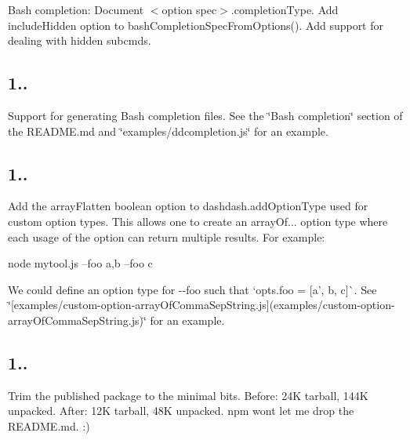 \begin{DoxyItemize}
\item Bash completion\+: Document {\ttfamily $<$option spec$>$.completion\+Type}. Add {\ttfamily include\+Hidden} option to {\ttfamily bash\+Completion\+Spec\+From\+Options()}. Add support for dealing with hidden subcmds.
\end{DoxyItemize}

\subsection*{1..}


\begin{DoxyItemize}
\item Support for generating Bash completion files. See the \char`\"{}\+Bash completion\char`\"{} section of the R\+E\+A\+D\+M\+E.\+md and \char`\"{}examples/ddcompletion.\+js\char`\"{} for an example.
\end{DoxyItemize}

\subsection*{1..}


\begin{DoxyItemize}
\item Add the {\ttfamily array\+Flatten} boolean option to {\ttfamily dashdash.\+add\+Option\+Type} used for custom option types. This allows one to create an {\ttfamily array\+Of...} option type where each usage of the option can return multiple results. For example\+: \begin{DoxyVerb}  node mytool.js --foo a,b --foo c
\end{DoxyVerb}


We could define an option type for {\ttfamily -\/-\/foo} such that `opts.\+foo = \mbox{[}\textquotesingle{}a', \textquotesingle{}b\textquotesingle{}, \textquotesingle{}c\textquotesingle{}\mbox{]}\`{}. See \char`\"{}\mbox{[}examples/custom-\/option-\/array\+Of\+Comma\+Sep\+String.\+js\mbox{]}(examples/custom-\/option-\/array\+Of\+Comma\+Sep\+String.\+js)\char`\"{} for an example.
\end{DoxyItemize}

\subsection*{1..}


\begin{DoxyItemize}
\item Trim the published package to the minimal bits. Before\+: 24K tarball, 144K unpacked. After\+: 12K tarball, 48K unpacked. {\ttfamily npm} won\textquotesingle{}t let me drop the R\+E\+A\+D\+M\+E.\+md. \+:)
\end{DoxyItemize}

